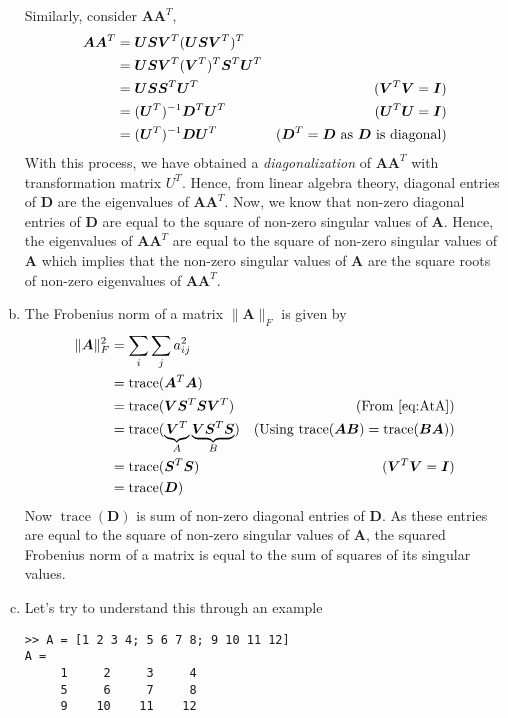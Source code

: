 \documentclass[a4paper,landscape]{article}
\begin{document}
\begin{enumerate}[(a)]
	Similarly, consider $\bm{A}\bm{A}^T$, 
	\begin{equation}
		\begin{aligned}
			\bm{A}\bm{A}^T &= \bm{U}\bm{S}\bm{V}^T (\bm{U}\bm{S}\bm{V}^T)^T\\
			&=  \bm{U}\bm{S}\bm{V}^T (\bm{V}^T)^T\bm{S}^T\bm{U}^T\\
			&=  \bm{U}\bm{S}\bm{S}^T\bm{U}^T &\hfill{(\bm{V}^T \bm{V} = \bm{I})}\\
			&=  (\bm{U}^T)^{-1}\bm{D}^T\bm{U}^T &\hfill{(\bm{U}^T \bm{U} = \bm{I})}\\
			&=  (\bm{U}^T)^{-1}\bm{D}\bm{U}^T &\hfill{(\bm{D}^T = \bm{D} \text{ as $\bm{D}$ is diagonal})}\\
		\end{aligned}
	\end{equation}
	With this process, we have obtained a \emph{diagonalization} of $\bm{A}\bm{A}^T$ with transformation matrix $U^T$.
	Hence, from linear algebra theory, diagonal entries of $\bm{D}$ are the eigenvalues of $\bm{A}\bm{A}^T$.
	Now, we know that non-zero diagonal entries of $\bm{D}$ are equal to the square of non-zero singular values of $\bm{A}$. 
	Hence, the eigenvalues of $\bm{A}\bm{A}^T$ are equal to the square of non-zero singular values of $\bm{A}$ which implies that the non-zero singular values of $\bm{A}$ are the square roots of non-zero eigenvalues of $\bm{A}\bm{A}^T$.
	\item 
	The Frobenius norm of a matrix $\|\bm{A}\|_F$ is given by
	\begin{equation}
		\begin{aligned}
			\|\bm{A}\|_F^2 &= \sum_{i}\sum_{j}a_{ij}^2\\
			&= \operatorname{trace}(\bm{A}^T\bm{A})\\
			&= \operatorname{trace}(\bm{V}\bm{S}^T\bm{S}\bm{V}^T) & \hfill{(\text{From \ref{eq:AtA}})}\\
			&= \operatorname{trace}(\underbrace{\bm{V}^T}_{A}\underbrace{\bm{V}\bm{S}^T\bm{S}}_{B}) & \hfill{(\text{Using $\operatorname{trace}(\bm{A}\bm{B})=\operatorname{trace}(\bm{B}\bm{A})$})}\\
			&= \operatorname{trace}(\bm{S}^T\bm{S}) &\hfill{(\bm{V}^T \bm{V} = \bm{I})}\\
			&= \operatorname{trace}(\bm{D})
		\end{aligned}
	\end{equation}
	Now $\operatorname{trace}(\bm{D})$ is sum of non-zero diagonal entries of $\bm{D}$. As these entries are equal to the square of non-zero singular values of $\bm{A}$, the squared Frobenius norm of a matrix is equal to the sum of squares of its singular values.
	\item 
	Let's try to understand this through an example
\begin{verbatim}
>> A = [1 2 3 4; 5 6 7 8; 9 10 11 12]
A =
     1     2     3     4
     5     6     7     8
     9    10    11    12


\end{verbatim}
\end{enumerate}
\end{document}

